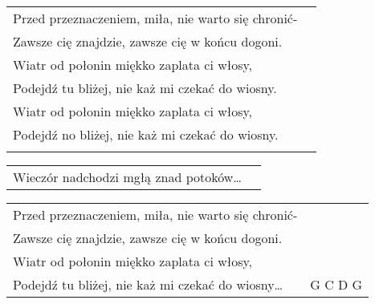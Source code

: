 \documentclass[a5paper]{article}
\begin{document}
\noindent
\begin{tabular}{@{}p{8.50cm}p{3cm}@{}}
Przed przeznaczeniem, miła, nie warto się chronić- \\
Zawsze cię znajdzie, zawsze cię w końcu dogoni. \\
Wiatr od połonin miękko zaplata ci włosy, \\
Podejdź tu bliżej, nie każ mi czekać do wiosny. \\ 
Wiatr od połonin miękko zaplata ci włosy, \\
Podejdź no bliżej, nie każ mi czekać do wiosny. \\ \\
\end{tabular}

\noindent
\begin{tabular}{@{}p{7.50cm}p{3cm}@{}}
Wieczór nadchodzi mgłą znad potoków… \\
\end{tabular}

\noindent
\begin{tabular}{@{}p{8.50cm}p{3cm}@{}}
Przed przeznaczeniem, miła, nie warto się chronić- \\
Zawsze cię znajdzie, zawsze cię w końcu dogoni. \\
Wiatr od połonin miękko zaplata ci włosy, \\
Podejdź tu bliżej, nie każ mi czekać do wiosny… & G C D G\\ 
\end{tabular}
\end{document}
